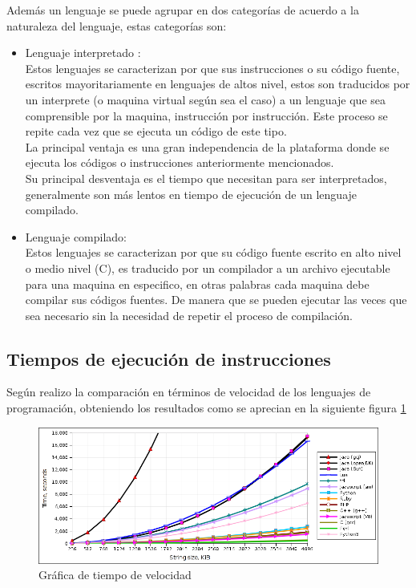 Además un lenguaje se puede agrupar en dos categorías de acuerdo a la naturaleza del lenguaje, estas categorías son:
\begin{itemize}
	\item Lenguaje interpretado	:\\
	Estos lenguajes se caracterizan por que sus instrucciones o su código fuente, escritos mayoritariamente en lenguajes de altos nivel, estos son traducidos por un interprete (o maquina virtual según sea el caso) a un lenguaje que sea comprensible por la maquina, instrucción por instrucción. Este proceso se repite cada vez que se ejecuta un código de este tipo.\\
	La principal ventaja es una gran independencia de la plataforma donde se ejecuta los códigos o instrucciones anteriormente mencionados.\\
	Su principal desventaja es el tiempo que necesitan para ser interpretados, generalmente son más lentos en tiempo de ejecución de un lenguaje compilado.  
	\item Lenguaje compilado:\\
	Estos lenguajes se caracterizan por que su código fuente escrito en alto nivel o medio nivel (C), es traducido por un compilador a un archivo ejecutable para una maquina en especifico, en otras palabras cada maquina debe compilar sus códigos fuentes. De manera que se pueden ejecutar las veces que sea necesario sin la necesidad de repetir el proceso de compilación.
\end{itemize}

\subsection*{Tiempos de ejecución de instrucciones}

Según \cite{speed} realizo la comparación en términos de velocidad de los lenguajes de programación, obteniendo los resultados como se aprecian en la siguiente figura \ref{speed} 

\begin{figure}[hbtp]
	\centering
	\includegraphics[width=15cm]{fig/speed.png}
	\caption{\label{speed} Gráfica de tiempo de velocidad}
\end{figure} 	

